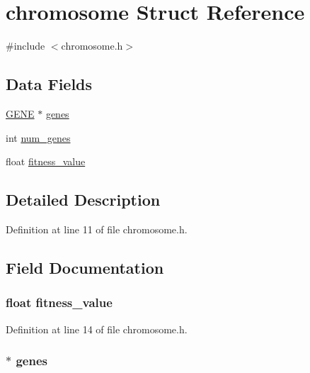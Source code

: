 \hypertarget{structchromosome}{}\section{chromosome Struct Reference}
\label{structchromosome}


{\ttfamily \#include $<$chromosome.\+h$>$}

\subsection*{Data Fields}
\begin{DoxyCompactItemize}
\item 
\hyperlink{ag_8h_a02a50e28dff2a9bbc394e7fe1ab3e065}{G\+E\+N\+E} $\ast$ \hyperlink{structchromosome_a60dbdcb96ea8257921bfd3c7813bc40b}{genes}
\item 
int \hyperlink{structchromosome_ae7b31eb7dc984aa11f5413e309a1877c}{num\+\_\+genes}
\item 
float \hyperlink{structchromosome_ac3e8d05a19bc880ca2736ad00e31b2af}{fitness\+\_\+value}
\end{DoxyCompactItemize}


\subsection{Detailed Description}


Definition at line 11 of file chromosome.\+h.



\subsection{Field Documentation}
\hypertarget{structchromosome_ac3e8d05a19bc880ca2736ad00e31b2af}{}
\subsubsection[{fitness\+\_\+value}]{\setlength{\rightskip}{0pt plus 5cm}float fitness\+\_\+value}\label{structchromosome_ac3e8d05a19bc880ca2736ad00e31b2af}


Definition at line 14 of file chromosome.\+h.

\hypertarget{structchromosome_a60dbdcb96ea8257921bfd3c7813bc40b}{}
\subsubsection[{genes}]{$\ast$ genes}\label{structchromosome_a60dbdcb96ea8257921bfd3c7813bc40b}


